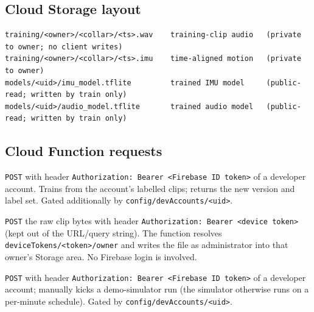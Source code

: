 \subsection{Cloud Storage layout}

\begin{lstlisting}[numbers=none,caption={Cloud Storage layout.},label={lst:storage}]
training/<owner>/<collar>/<ts>.wav    training-clip audio   (private to owner; no client writes)
training/<owner>/<collar>/<ts>.imu    time-aligned motion   (private to owner)
models/<uid>/imu_model.tflite         trained IMU model     (public-read; written by train only)
models/<uid>/audio_model.tflite       trained audio model   (public-read; written by train only)
\end{lstlisting}

\subsection{Cloud Function requests}

\begin{description}[leftmargin=1.6em,style=nextline]
  \item[\texttt{train}] \texttt{POST} with header \texttt{Authorization: Bearer <Firebase ID token>}
        of a developer account. Trains from the account's labelled clips; returns the new version and
        label set. Gated additionally by \texttt{config/devAccounts/<uid>}.
  \item[\texttt{upload\_clip}] \texttt{POST} the raw clip bytes with header
        \texttt{Authorization: Bearer <device token>} (kept out of the URL/query string). The function
        resolves \texttt{deviceTokens/<token>/owner} and writes the file as administrator into that
        owner's Storage area. No Firebase login is involved.
  \item[\texttt{simulate\_now}] \texttt{POST} with header \texttt{Authorization: Bearer <Firebase ID
        token>} of a developer account; manually kicks a demo-simulator run (the simulator otherwise
        runs on a per-minute schedule). Gated by \texttt{config/devAccounts/<uid>}.
\end{description}
